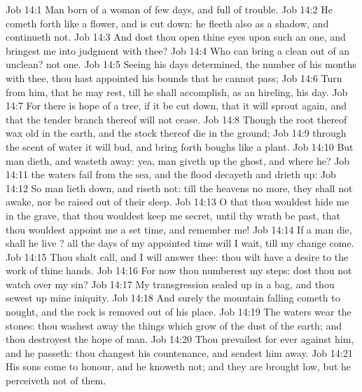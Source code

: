 \vs Job 14:1 Man  born of a woman  of few days, and full of trouble.
\vs Job 14:2 He cometh forth like a flower, and is cut down: he fleeth also as a shadow, and continueth not.
\vs Job 14:3 And dost thou open thine eyes upon such an one, and bringest me into judgment with thee?
\vs Job 14:4 Who can bring a clean  out of an unclean? not one.
\vs Job 14:5 Seeing his days  determined, the number of his months  with thee, thou hast appointed his bounds that he cannot pass;
\vs Job 14:6 Turn from him, that he may rest, till he shall accomplish, as an hireling, his day.
\vs Job 14:7 For there is hope of a tree, if it be cut down, that it will sprout again, and that the tender branch thereof will not cease.
\vs Job 14:8 Though the root thereof wax old in the earth, and the stock thereof die in the ground;
\vs Job 14:9  through the scent of water it will bud, and bring forth boughs like a plant.
\vs Job 14:10 But man dieth, and wasteth away: yea, man giveth up the ghost, and where  he?
\vs Job 14:11  the waters fail from the sea, and the flood decayeth and drieth up:
\vs Job 14:12 So man lieth down, and riseth not: till the heavens  no more, they shall not awake, nor be raised out of their sleep.
\vs Job 14:13 O that thou wouldest hide me in the grave, that thou wouldest keep me secret, until thy wrath be past, that thou wouldest appoint me a set time, and remember me!
\vs Job 14:14 If a man die, shall he live ? all the days of my appointed time will I wait, till my change come.
\vs Job 14:15 Thou shalt call, and I will answer thee: thou wilt have a desire to the work of thine hands.
\vs Job 14:16 For now thou numberest my steps: dost thou not watch over my sin?
\vs Job 14:17 My transgression  sealed up in a bag, and thou sewest up mine iniquity.
\vs Job 14:18 And surely the mountain falling cometh to nought, and the rock is removed out of his place.
\vs Job 14:19 The waters wear the stones: thou washest away the things which grow  of the dust of the earth; and thou destroyest the hope of man.
\vs Job 14:20 Thou prevailest for ever against him, and he passeth: thou changest his countenance, and sendest him away.
\vs Job 14:21 His sons come to honour, and he knoweth  not; and they are brought low, but he perceiveth  not of them.
